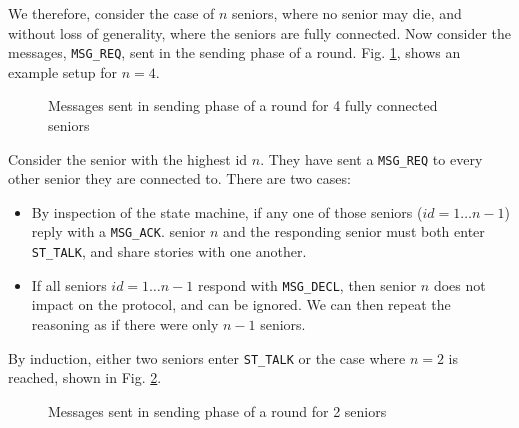 \documentclass[12pt,a4paper]{scrartcl}
\begin{document}
We therefore, consider the case of $n$ seniors, where no senior may die, and without loss of generality, where the seniors are fully connected.
Now consider the messages, \texttt{MSG\_REQ}, sent in the sending phase of a round.
Fig. \ref{fig:termination-n4}, shows an example setup for $n = 4$.
\begin{figure}[h]
   \centering
   \caption{Messages sent in sending phase of a round for 4 fully connected seniors}
   \label{fig:termination-n4}
\end{figure}

Consider the senior with the highest id $n$.
They have sent a \texttt{MSG\_REQ} to every other senior they are connected to.
There are two cases:
\begin{itemize}
    \item By inspection of the state machine, if any one of those seniors ($id = 1 \ldots n-1$) reply with a \texttt{MSG\_ACK}.
          senior $n$ and the responding senior must both enter \texttt{ST\_TALK}, and share stories with one another.
    \item If all seniors $id = 1 \ldots n-1$ respond with \texttt{MSG\_DECL}, then senior $n$ does not impact on the protocol, and can be ignored.
          We can then repeat the reasoning as if there were only $n-1$ seniors.
\end{itemize}

By induction, either two seniors enter \texttt{ST\_TALK} or the case where $n=2$ is reached, shown in Fig. \ref{fig:termination-n2}.
\begin{figure}[h]
   \centering
   \caption{Messages sent in sending phase of a round for 2 seniors}
   \label{fig:termination-n2}
\end{figure}
\end{document}
